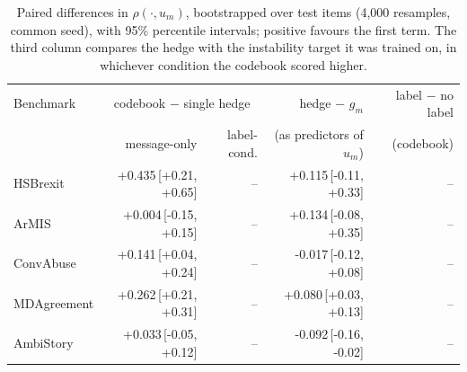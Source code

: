 \begin{table}[t]
\centering
\small
\begin{tabular}{lrrrr}
\hline
Benchmark & \multicolumn{2}{c}{codebook $-$ single hedge} & hedge $-$ $g_m$ & label $-$ no label \\
 & message-only & label-cond. & (as predictors of $u_m$) & (codebook) \\
\hline
HSBrexit & +0.435{\scriptsize\,[+0.21, +0.65]} & -- & +0.115{\scriptsize\,[-0.11, +0.33]} & -- \\
ArMIS & +0.004{\scriptsize\,[-0.15, +0.15]} & -- & +0.134{\scriptsize\,[-0.08, +0.35]} & -- \\
ConvAbuse & +0.141{\scriptsize\,[+0.04, +0.24]} & -- & -0.017{\scriptsize\,[-0.12, +0.08]} & -- \\
MDAgreement & +0.262{\scriptsize\,[+0.21, +0.31]} & -- & +0.080{\scriptsize\,[+0.03, +0.13]} & -- \\
AmbiStory & +0.033{\scriptsize\,[-0.05, +0.12]} & -- & -0.092{\scriptsize\,[-0.16, -0.02]} & -- \\
\hline
\end{tabular}
\caption{Paired differences in $\rho(\cdot,u_m)$, bootstrapped over test items (4,000 resamples, common seed), with 95\% percentile intervals; positive favours the first term. The third column compares the hedge with the instability target it was trained on, in whichever condition the codebook scored higher.}
\label{tab:paired}
\end{table}